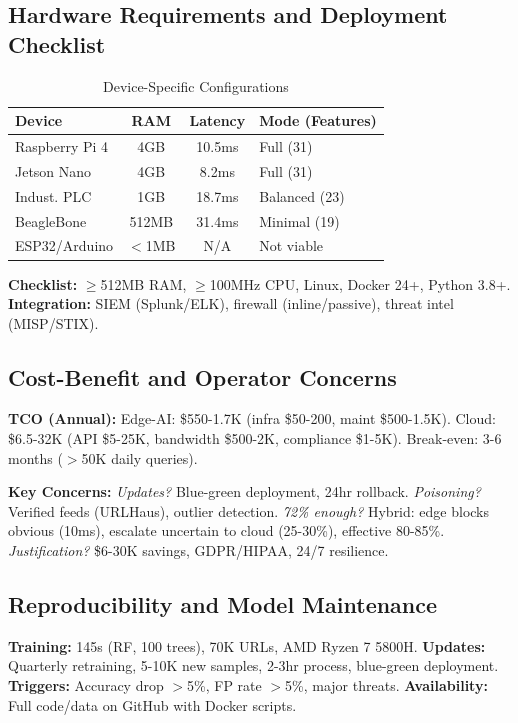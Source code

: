 \documentclass[conference]{IEEEtran}
\begin{document}
\subsection{Hardware Requirements and Deployment Checklist}

\begin{table}[htbp]
\centering
\caption{Device-Specific Configurations}
{\scriptsize
\begin{tabular}{@{}lccp{2.5cm}@{}}
\toprule
\textbf{Device} & \textbf{RAM} & \textbf{Latency} & \textbf{Mode (Features)} \\
\midrule
Raspberry Pi 4 & 4GB & 10.5ms & Full (31) \\
Jetson Nano & 4GB & 8.2ms & Full (31) \\
Indust. PLC & 1GB & 18.7ms & Balanced (23) \\
BeagleBone & 512MB & 31.4ms & Minimal (19) \\
ESP32/Arduino & $<$1MB & N/A & Not viable \\
\bottomrule
\end{tabular}
}
\end{table}

{\small
\textbf{Checklist:} $\geq$512MB RAM, $\geq$100MHz CPU, Linux, Docker 24+, Python 3.8+. \textbf{Integration:} SIEM (Splunk/ELK), firewall (inline/passive), threat intel (MISP/STIX).
}

\subsection{Cost-Benefit and Operator Concerns}

{\small
\textbf{TCO (Annual):} Edge-AI: \$550-1.7K (infra \$50-200, maint \$500-1.5K). Cloud: \$6.5-32K (API \$5-25K, bandwidth \$500-2K, compliance \$1-5K). Break-even: 3-6 months ($>$50K daily queries).

\textbf{Key Concerns:} \textit{Updates?} Blue-green deployment, 24hr rollback. \textit{Poisoning?} Verified feeds (URLHaus), outlier detection. \textit{72\% enough?} Hybrid: edge blocks obvious (10ms), escalate uncertain to cloud (25-30\%), effective 80-85\%. \textit{Justification?} \$6-30K savings, GDPR/HIPAA, 24/7 resilience.
}

\subsection{Reproducibility and Model Maintenance}

{\small
\textbf{Training:} 145s (RF, 100 trees), 70K URLs, AMD Ryzen 7 5800H. \textbf{Updates:} Quarterly retraining, 5-10K new samples, 2-3hr process, blue-green deployment. \textbf{Triggers:} Accuracy drop $>$5\%, FP rate $>$5\%, major threats. \textbf{Availability:} Full code/data on GitHub with Docker scripts.
}
\end{document}
